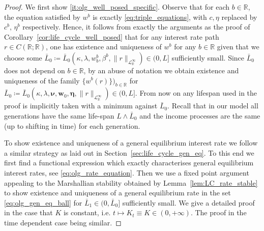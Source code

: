\documentclass[10pt,a4paper]{amsart}
\theoremstyle{plain}
\theoremstyle{plain}
\theoremstyle{definition}
\theoremstyle{remark}
\newcommand{\bmeta}{\boldsymbol{\eta}}
\newcommand{\bnu}{\boldsymbol{\nu}}
\newcommand{\bw}{\mathbf{w}}
\newcommand{\mbR}{\mathbb{R}}
\newcommand{\msL}{\mathscr{L}}
\begin{document}
\begin{proof}
We first show \ref{it:olg_well_posed_specific}. Observe that for each $b\in \mbR$, the equation satisfied by $w^b$ is exactly \eqref{eq:triple_equations}, with $c,\eta$ replaced by $c^b,\, \eta^b$ respectively. Hence, it follows from exactly the arguments as the proof of Corollary~\ref{cor:life_cycle_well_posed} that for any interest rate path $r\in C(\mbR;\mbR)$, one has existence and uniqueness of $w^b$ for any $b\in \mbR$ given that we choose some $\bar{L}_0\coloneqq \bar{L}_0(\kappa,\lambda,w^b_b,\beta^b,\|r\|_{\msL^\infty_\mbR}) \in (0,L]$ sufficiently small. Since $\bar{L}_0$ does not depend on $b\in \mbR$, by an abuse of notation we obtain existence and uniqueness of the family $\{w^b(r)\})_{b\in \mbR}$ for $\bar{L}_0 \coloneqq \bar{L}_0(\kappa,\lambda,\bnu, \bw_0,\bmeta,\|r\|_{\msL^\infty_\mbR}) \in (0,L]$. From now on any lifespan used in the proof is implicitly taken with a minimum against $\bar{L}_0$. Recall that in our model all generations have the same life-span $L \wedge \bar{L}_0$ and the income processes are the same (up to shifting in time) for each generation. %

    To show existence and uniqueness of a general equilibrium interest rate we follow a similar strategy as laid out in Section~\ref{sec:life_cycle_gen_eq}. To this end we first find a functional expression which exactly characterises general equilibrium interest rates, see \eqref{eq:olg_rate_equation}. Then we use a fixed point argument appealing to the Marshallian stability  obtained by Lemma~\ref{lem:LC_rate_stable} to show existence and uniqueness of a general equilibrium rate in the set \eqref{eq:olg_gen_eq_ball} for $\bar{L}_1 \in (0,\bar{L}_0]$ sufficiently small. We give a detailed proof in the case that $K$ is constant, i.e. $t\mapsto K_t\equiv K\in (0,+\infty)$.  The proof in the time dependent case being similar. 
    

\end{proof}
\end{document}
